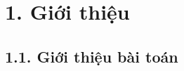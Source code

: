 \documentclass[../main.tex]{subfiles}
\begin{document}
\section{1. Giới thiệu}

\subsection{1.1. Giới thiệu bài toán}

\end{document}
